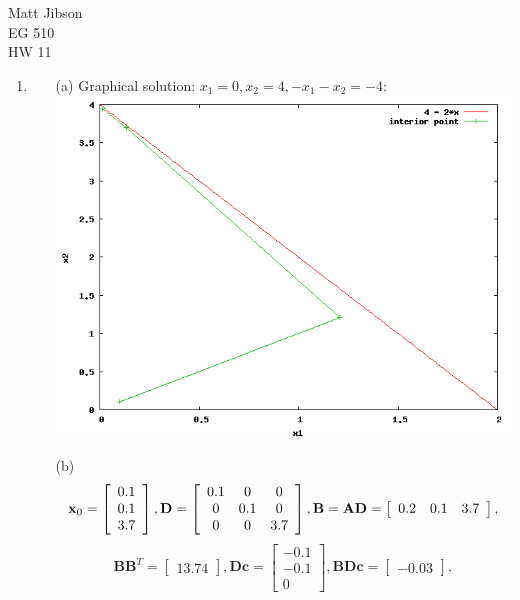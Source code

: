 \documentclass{article}
\begin{document}
\begin{flushright}
Matt Jibson \\
EG 510 \\
HW 11
\end{flushright}

\begin{enumerate}
	\item
		\begin{itemize}
			\item [(a)] Graphical solution: $x_1 = 0, x_2 = 4, -x_1 - x_2 = -4$: \\
				\includegraphics[width=0.8\linewidth]{1a.png}
			\item [(b)]
				\begin{displaymath}
					\mathbf{x}_0 = \left[ \begin{array}{c} 0.1 \\ 0.1 \\ 3.7 \end{array} \right],
					\mathbf{D} = \left[ \begin{array}{c c c} 0.1 & 0 & 0 \\ 0 & 0.1 & 0 \\ 0 & 0 & 3.7 \end{array} \right],
					\mathbf{B} = \mathbf{AD} = \left[ \begin{array}{c c c} 0.2 & 0.1 & 3.7 \end{array} \right],
				\end{displaymath}
				\begin{displaymath}
					\mathbf{BB}^T = \left[ \begin{array}{c} 13.74 \end{array} \right], \mathbf{Dc} = \left[ \begin{array}{c} -0.1 \\ -0.1 \\ 0 \end{array} \right], \mathbf{BDc} = \left[ \begin{array}{c} -0.03 \end{array} \right],

\end{displaymath}
\end{itemize}
\end{enumerate}
\end{document}

